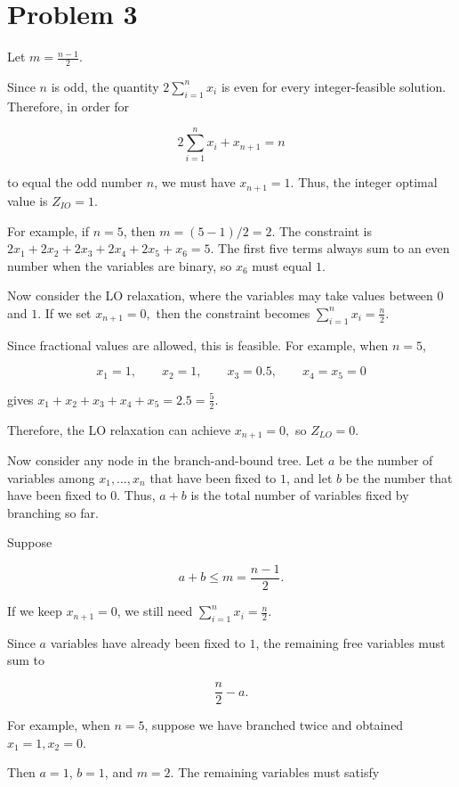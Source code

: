 \documentclass{article}
\begin{document}
\vspace{7mm}

\section*{Problem 3}

Let $
m=\frac{n-1}{2}.
$

Since $n$ is odd, the quantity $
2\sum_{i=1}^{n}x_i
$ is even for every integer-feasible solution. Therefore, in order for

\[
2\sum_{i=1}^{n}x_i+x_{n+1}=n
\]

to equal the odd number $n$, we must have $ 
x_{n+1}=1.
$
Thus, the integer optimal value is $
Z_{IO}=1.
$

For example, if $n=5$, then $m=(5-1)/2=2$. The constraint is $
2x_1+2x_2+2x_3+2x_4+2x_5+x_6=5.
$ The first five terms always sum to an even number when the variables are binary, so $x_6$ must equal $1$.

Now consider the LO relaxation, where the variables may take values between $0$ and $1$. If we set $
x_{n+1}=0, $ then the constraint becomes $
\sum_{i=1}^{n}x_i=\frac{n}{2}.
$

Since fractional values are allowed, this is feasible. For example, when $n=5$,

\[
x_1=1,\qquad x_2=1,\qquad x_3=0.5,\qquad x_4=x_5=0
\]

gives $
x_1+x_2+x_3+x_4+x_5=2.5=\frac{5}{2}.
$

Therefore, the LO relaxation can achieve $
x_{n+1}=0,
$  so $
Z_{LO}=0.
$

Now consider any node in the branch-and-bound tree. Let $a$ be the number of variables among $x_1,\ldots,x_n$ that have been fixed to $1$, and let $b$ be the number that have been fixed to $0$. Thus, $a+b$ is the total number of variables fixed by branching so far.

Suppose

\[
a+b\leq m=\frac{n-1}{2}.
\]

If we keep $x_{n+1}=0$, we still need $
\sum_{i=1}^{n}x_i=\frac{n}{2}.
$ 

Since $a$ variables have already been fixed to $1$, the remaining free variables must sum to

\[
\frac{n}{2}-a.
\]

For example, when $n=5$, suppose we have branched twice and obtained $
x_1=1, x_2=0.
$

Then $a=1$, $b=1$, and $m=2$. The remaining variables must satisfy
\end{document}
